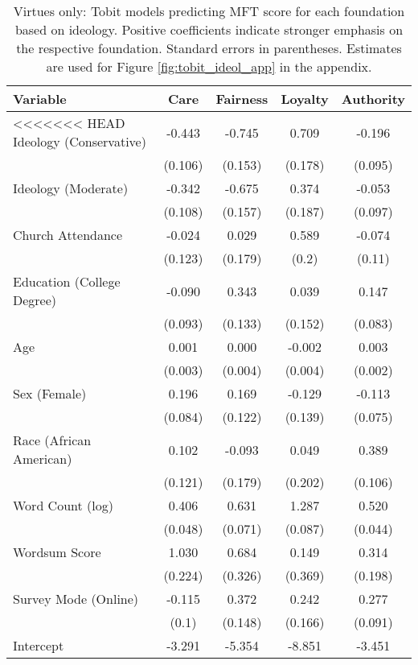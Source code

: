 \begin{table}[ht]
\centering
\caption{Virtues only: Tobit models predicting MFT score for each foundation based 
           on ideology. Positive coefficients indicate stronger emphasis on the respective 
           foundation. Standard errors in parentheses. Estimates are used for 
           Figure \ref{fig:tobit_ideol_app} in the appendix.} 
\label{tab:tobit_virtue}
\begingroup\footnotesize
\begin{tabular}{lcccc}
  \hline
Variable & Care & Fairness & Loyalty & Authority \\ 
  \hline
<<<<<<< HEAD
Ideology (Conservative) & -0.443 & -0.745 &  0.709 & -0.196 \\ 
   & (0.106) & (0.153) & (0.178) & (0.095) \\ 
  Ideology (Moderate) & -0.342 & -0.675 &  0.374 & -0.053 \\ 
   & (0.108) & (0.157) & (0.187) & (0.097) \\ 
  Church Attendance & -0.024 &  0.029 &  0.589 & -0.074 \\ 
   & (0.123) & (0.179) & (0.2) & (0.11) \\ 
  Education (College Degree) & -0.090 &  0.343 &  0.039 &  0.147 \\ 
   & (0.093) & (0.133) & (0.152) & (0.083) \\ 
  Age &  0.001 &  0.000 & -0.002 &  0.003 \\ 
   & (0.003) & (0.004) & (0.004) & (0.002) \\ 
  Sex (Female) &  0.196 &  0.169 & -0.129 & -0.113 \\ 
   & (0.084) & (0.122) & (0.139) & (0.075) \\ 
  Race (African American) &  0.102 & -0.093 &  0.049 &  0.389 \\ 
   & (0.121) & (0.179) & (0.202) & (0.106) \\ 
  Word Count (log) &  0.406 &  0.631 &  1.287 &  0.520 \\ 
   & (0.048) & (0.071) & (0.087) & (0.044) \\ 
  Wordsum Score &  1.030 &  0.684 &  0.149 &  0.314 \\ 
   & (0.224) & (0.326) & (0.369) & (0.198) \\ 
  Survey Mode (Online) & -0.115 &  0.372 &  0.242 &  0.277 \\ 
   & (0.1) & (0.148) & (0.166) & (0.091) \\ 
  Intercept & -3.291 & -5.354 & -8.851 & -3.451 \\ 

\end{tabular}
\end{table}
